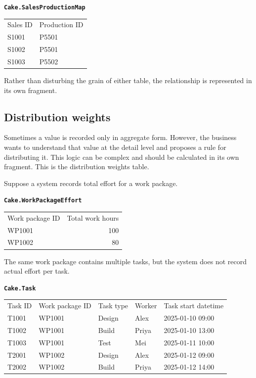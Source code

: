 \documentclass[10pt,openany,10pt]{book}
\newcounter{none}
\let\podeToprule\toprule
\let\podeMidrule\midrule
\let\podeBottomrule\bottomrule
\renewcommand{\toprule}{\arrayrulecolor{pbiGrid}\podeToprule}
\renewcommand{\midrule}{\arrayrulecolor{pbiGrid}\podeMidrule}
\renewcommand{\bottomrule}{\arrayrulecolor{pbiGrid}\podeBottomrule}
\begin{document}
\textbf{\texttt{Cake.SalesProductionMap}}

{\def\LTcaptype{none} %
\begin{longtable}[]{@{}ll@{}}
\toprule\noalign{}
Sales ID & Production ID \\
\midrule\noalign{}
\endhead
\bottomrule\noalign{}
\endlastfoot
S1001 & P5501 \\
S1002 & P5501 \\
S1003 & P5502 \\
\end{longtable}
}

Rather than disturbing the grain of either table, the relationship is
represented in its own fragment.

\subsection{Distribution weights}\label{distribution-weights}

Sometimes a value is recorded only in aggregate form. However, the
business wants to understand that value at the detail level and proposes
a rule for distributing it. This logic can be complex and should be
calculated in its own fragment. This is the distribution weights table.

Suppose a system records total effort for a work package.

\textbf{\texttt{Cake.WorkPackageEffort}}

{\def\LTcaptype{none} %
\begin{longtable}[]{@{}lr@{}}
\toprule\noalign{}
Work package ID & Total work hours \\
\midrule\noalign{}
\endhead
\bottomrule\noalign{}
\endlastfoot
WP1001 & 100 \\
WP1002 & 80 \\
\end{longtable}
}

The same work package contains multiple tasks, but the system does not
record actual effort per task.

\textbf{\texttt{Cake.Task}}

{\def\LTcaptype{none} %
\begin{longtable}[]{@{}lllll@{}}
\toprule\noalign{}
Task ID & Work package ID & Task type & Worker & Task start datetime \\
\midrule\noalign{}
\endhead
\bottomrule\noalign{}
\endlastfoot
T1001 & WP1001 & Design & Alex & 2025-01-10 09:00 \\
T1002 & WP1001 & Build & Priya & 2025-01-10 13:00 \\
T1003 & WP1001 & Test & Mei & 2025-01-11 10:00 \\
T2001 & WP1002 & Design & Alex & 2025-01-12 09:00 \\
T2002 & WP1002 & Build & Priya & 2025-01-12 14:00 \\
\end{longtable}
}
\end{document}
